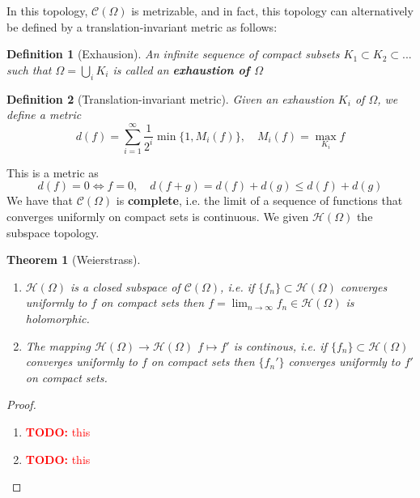 \documentclass{article}
\newtheorem{theorem}{Theorem}
\newcommand{\mc}[1]{\mathcal{#1}}
\newtheorem{definition}{Definition}
\newcommand{\TODO}[1]{\begin{center}\huge{\textcolor{red}{\textbf{TODO:} #1}}\end{center}}
\begin{document}
In this topology, \(\mc{C}(\Omega)\) is metrizable, and in fact, this topology can alternatively be defined by a translation-invariant metric as follows:
\begin{definition}[Exhausion]
An infinite sequence of compact subsets \(K_1 \subset K_2 \subset ...\) such that \(\Omega = \bigcup_i K_i\) is called an \textbf{exhaustion of \(\Omega\)}
\end{definition}
\begin{definition}[Translation-invariant metric]
Given an exhaustion \(K_i\) of \(\Omega\), we define a metric
\begin{equation}d(f) = \sum_{i = 1}^\infty\frac{1}{2^i}\min\{1, M_i(f)\}, \quad M_i(f) = \max_{K_i}f\end{equation}
\end{definition}
This is a metric as
\begin{equation}d(f) = 0 \iff f = 0, \quad d(f + g) = d(f) + d(g) \leq d(f) + d(g)\end{equation}
We have that \(\mc{C}(\Omega)\) is \textbf{complete}, i.e. the limit of a sequence of functions that converges uniformly on compact sets is continuous. We given \(\mc{H}(\Omega)\) the subspace topology.
\begin{theorem}[Weierstrass]
\begin{enumerate}
  \item \(\mc{H}(\Omega)\) is a closed subspace of \(\mc{C}(\Omega)\), i.e. if \(\{f_n\} \subset \mc{H}(\Omega)\) converges uniformly to \(f\) on compact sets then \(f = \lim_{n \to \infty}f_n \in \mc{H}(\Omega)\) is holomorphic.
  \item The mapping \(\mc{H}(\Omega) \to \mc{H}(\Omega)\) \(f \mapsto f'\) is continous, i.e. if \(\{f_n\} \subset \mc{H}(\Omega)\) converges uniformly to \(f\) on compact sets then \(\{f_n'\}\) converges uniformly to \(f'\) on compact sets.
\end{enumerate}
\end{theorem}
\begin{proof}
\begin{enumerate}

  \item \TODO{this}

  \item \TODO{this}

\end{enumerate}
\end{proof}
\end{document}
